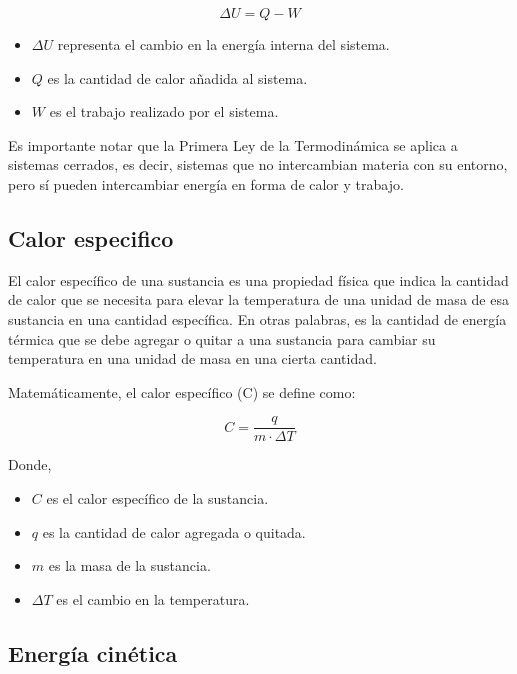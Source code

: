 \documentclass[letterpaper, 12pt]{article}
\begin{document}
\begin{equation*}
      \Delta U = Q - W
\end{equation*}

\begin{itemize}[label=$\triangleright$]
      \item $\Delta U$ representa el cambio en la energía interna del sistema.
      \item $Q$ es la cantidad de calor añadida al sistema.
      \item $W$ es el trabajo realizado por el sistema.
\end{itemize}

Es importante notar que la Primera Ley de la Termodinámica
se aplica a sistemas cerrados, es decir, sistemas que no
intercambian materia con su entorno, pero sí pueden
intercambiar energía en forma de calor y trabajo.

\subsection{Calor especifico~\cite{rointe_2023}}

El calor específico de una sustancia es una propiedad
física que indica la cantidad de calor que se necesita para
elevar la temperatura de una unidad de masa de esa
sustancia en una cantidad específica. En otras palabras, es
la cantidad de energía térmica que se debe agregar o quitar
a una sustancia para cambiar su temperatura en una unidad
de masa en una cierta cantidad.

Matemáticamente, el calor específico (C) se define como:

\begin{equation*}
      C = \frac{q}{m \cdot \Delta T}
\end{equation*}

Donde,

\begin{itemize}
      \item $C$ es el calor específico de la sustancia.
      \item $q$ es la cantidad de calor agregada o quitada.
      \item $m$ es la masa de la sustancia.
      \item $\Delta T$ es el cambio en la temperatura.
\end{itemize}

\subsection{Energía cinética~\cite{energia_cinetica}}
\end{document}
